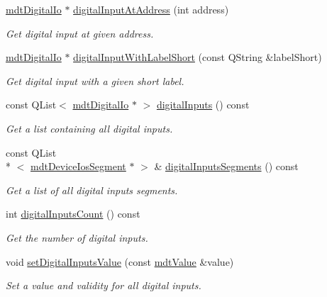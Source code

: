 \begin{DoxyCompactItemize}
\hyperlink{classmdt_digital_io}{mdt\-Digital\-Io} $\ast$ \hyperlink{classmdt_device_ios_a9df04d579a6642e5cf717c792cba34f9}{digital\-Input\-At\-Address} (int address)
\begin{DoxyCompactList}\small\item\em Get digital input at given address. \end{DoxyCompactList}\item 
\hyperlink{classmdt_digital_io}{mdt\-Digital\-Io} $\ast$ \hyperlink{classmdt_device_ios_abcde6de5a0ca6d642af04c21250d6555}{digital\-Input\-With\-Label\-Short} (const Q\-String \&label\-Short)
\begin{DoxyCompactList}\small\item\em Get digital input with a given short label. \end{DoxyCompactList}\item 
const Q\-List$<$ \hyperlink{classmdt_digital_io}{mdt\-Digital\-Io} $\ast$ $>$ \hyperlink{classmdt_device_ios_adb2cbcd4adcee1e9434634694ee1ae24}{digital\-Inputs} () const 
\begin{DoxyCompactList}\small\item\em Get a list containing all digital inputs. \end{DoxyCompactList}\item 
const Q\-List\\*
$<$ \hyperlink{classmdt_device_ios_segment}{mdt\-Device\-Ios\-Segment} $\ast$ $>$ \& \hyperlink{classmdt_device_ios_adc81519c2e6edc7fe54663c77d6eb503}{digital\-Inputs\-Segments} () const 
\begin{DoxyCompactList}\small\item\em Get a list of all digital inputs segments. \end{DoxyCompactList}\item 
int \hyperlink{classmdt_device_ios_a8d6306c16a25c82d6d8002020f4dc16a}{digital\-Inputs\-Count} () const 
\begin{DoxyCompactList}\small\item\em Get the number of digital inputs. \end{DoxyCompactList}\item 
void \hyperlink{classmdt_device_ios_a136d4a817fbd14c375ff068c436f3eeb}{set\-Digital\-Inputs\-Value} (const \hyperlink{classmdt_value}{mdt\-Value} \&value)
\begin{DoxyCompactList}\small\item\em Set a value and validity for all digital inputs. \end{DoxyCompactList}\item 

\end{DoxyCompactItemize}
